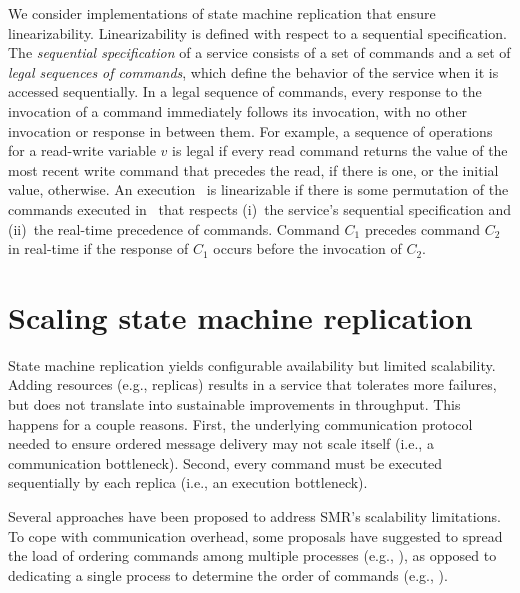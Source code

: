 We consider implementations of state machine replication that ensure
linearizability. Linearizability is defined with respect to a sequential
specification. The \emph{sequential specification} of a service consists of a
set of commands and a set of \emph{legal sequences of commands}, which define
the behavior of the service when it is accessed sequentially. In a legal
sequence of commands, every response to the invocation of a command immediately
follows its invocation, with no other invocation or response in between them.
For example, a sequence of operations for a read-write variable $v$ is legal if
every read command returns the value of the most recent write command that
precedes the read, if there is one, or the initial value, otherwise. An
execution \ex\ is linearizable if there is some permutation of the commands
executed in \ex\ that respects (i)~the service's sequential specification and
(ii)~the real-time precedence of commands. Command $C_1$ precedes command $C_2$
in real-time if the response of $C_1$ occurs before the invocation of $C_2$.


\section{Scaling state machine replication}

State machine replication yields configurable availability but limited
scalability. Adding resources (e.g., replicas) results in a service that
tolerates more failures, but does not translate into sustainable improvements in
throughput. This happens for a couple reasons. First, the underlying
communication protocol needed to ensure ordered message delivery may not scale
itself (i.e., a communication bottleneck). Second, every command must be
executed sequentially by each replica (i.e., an execution bottleneck).

Several approaches have been proposed to address SMR's scalability limitations.
To cope with communication overhead, some proposals have suggested to spread the
load of ordering commands among multiple processes (e.g.,
\cite{Moraru:2013gw,Mencius,Marandi:2012hb}), as opposed to dedicating a single
process to determine the order of commands (e.g.,
\cite{Lamport:1998ea}).%

